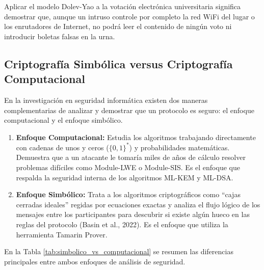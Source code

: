 Aplicar el modelo Dolev-Yao a la votación electrónica universitaria significa demostrar que, aunque un intruso controle por completo la red WiFi del lugar o los enrutadores de Internet, no podrá leer el contenido de ningún voto ni introducir boletas falsas en la urna.

\subsection{Criptografía Simbólica versus Criptografía Computacional}

En la investigación en seguridad informática existen dos maneras complementarias de analizar y demostrar que un protocolo es seguro: el enfoque computacional y el enfoque simbólico.

\begin{enumerate}
	\item \textbf{Enfoque Computacional:} Estudia los algoritmos trabajando directamente con cadenas de unos y ceros ($\{0, 1\}^*$) y probabilidades matemáticas. Demuestra que a un atacante le tomaría miles de años de cálculo resolver problemas difíciles como Module-LWE o Module-SIS. Es el enfoque que respalda la seguridad interna de los algoritmos ML-KEM y ML-DSA.

	\item \textbf{Enfoque Simbólico:} Trata a los algoritmos criptográficos como ``cajas cerradas ideales'' regidas por ecuaciones exactas y analiza el flujo lógico de los mensajes entre los participantes para descubrir si existe algún hueco en las reglas del protocolo (Basin et al., 2022). Es el enfoque que utiliza la herramienta Tamarin Prover.
\end{enumerate}

En la Tabla \ref{tab:simbolico_vs_computacional} se resumen las diferencias principales entre ambos enfoques de análisis de seguridad.

